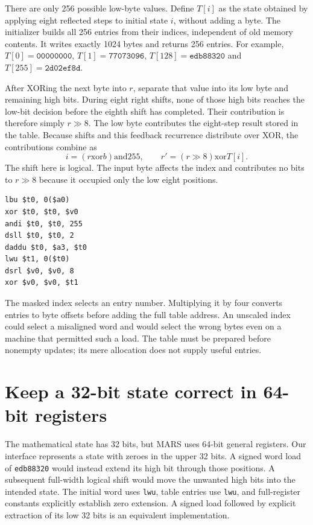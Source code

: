 There are only 256 possible low-byte values. Define $T[i]$ as the state obtained
by applying eight reflected steps to initial state $i$, without adding a byte.
The initializer builds all 256 entries from their indices, independent of old
memory contents. It writes exactly 1024 bytes and returns 256 entries.
For example, $T[0]=\texttt{00000000}$, $T[1]=\texttt{77073096}$,
$T[128]=\texttt{edb88320}$ and $T[255]=\texttt{2d02ef8d}$.

After XORing the next byte into $r$, separate that value into its low byte and
remaining high bits. During eight right shifts, none of those high bits reaches
the low-bit decision before the eighth shift has completed. Their contribution
is therefore simply $r\gg8$. The low byte contributes the eight-step result
stored in the table. Because shifts and this feedback recurrence distribute over
XOR, the contributions combine as
\[
  i=(r\mathbin{\mathrm{xor}}b)\mathbin{\mathrm{and}}255,
  \qquad r'=(r\gg8)\mathbin{\mathrm{xor}}T[i].
\]
The shift here is logical. The input byte affects the index and contributes no
bits to $r\gg8$ because it occupied only the low eight positions.

\begin{verbatim}
lbu $t0, 0($a0)
xor $t0, $t0, $v0
andi $t0, $t0, 255
dsll $t0, $t0, 2
daddu $t0, $a3, $t0
lwu $t1, 0($t0)
dsrl $v0, $v0, 8
xor $v0, $v0, $t1
\end{verbatim}

The masked index selects an entry number. Multiplying it by four converts entries
to byte offsets before adding the full table address. An unscaled index could
select a misaligned word and would select the wrong bytes even on a machine
that permitted such a load. The table must be prepared before nonempty updates;
its mere allocation does not supply useful entries.

\section{Keep a 32-bit state correct in 64-bit registers}

The mathematical state has 32 bits, but MARS uses 64-bit general registers.
Our interface represents a state with zeroes in the upper 32 bits. A signed word
load of \texttt{edb88320} would instead extend its high bit through those positions.
A subsequent full-width logical shift would move the unwanted high bits into
the intended state. The initial word uses \texttt{lwu}, table entries use
\texttt{lwu}, and full-register constants explicitly establish zero extension.
A signed load followed by explicit extraction of its low 32 bits is an equivalent
implementation.

